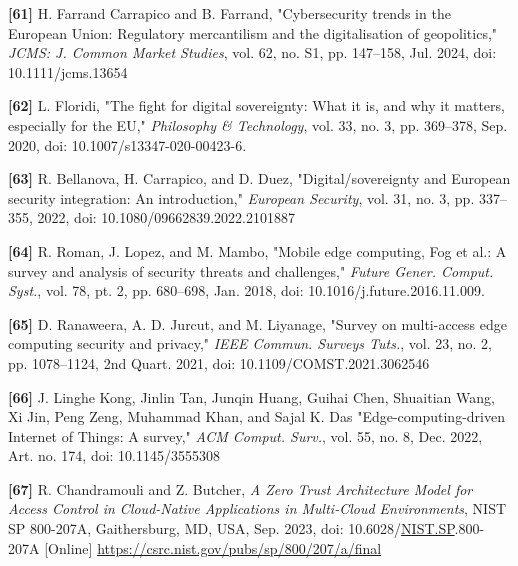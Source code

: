 \documentclass{ieeeaccess}
\begin{document}
\textbf{{[}61{]}} H. Farrand Carrapico and B. Farrand, "Cybersecurity
trends in the European Union: Regulatory mercantilism and the
digitalisation of geopolitics," \emph{JCMS: J. Common Market Studies},
vol. 62, no. S1, pp. 147--158, Jul. 2024, doi: 10.1111/jcms.13654

\textbf{{[}62{]}} L. Floridi, "The fight for digital sovereignty: What
it is, and why it matters, especially for the EU," \emph{Philosophy \&
Technology}, vol. 33, no. 3, pp. 369--378, Sep. 2020, doi:
10.1007/s13347-020-00423-6.

\textbf{{[}63{]}} R. Bellanova, H. Carrapico, and D. Duez,
"Digital/sovereignty and European security integration: An
introduction," \emph{European Security}, vol. 31, no. 3, pp. 337--355,
2022, doi: 10.1080/09662839.2022.2101887

\textbf{{[}64{]}} R. Roman, J. Lopez, and M. Mambo, "Mobile edge
computing, Fog et al.: A survey and analysis of security threats and
challenges," \emph{Future Gener. Comput. Syst.}, vol. 78, pt. 2, pp.
680--698, Jan. 2018, doi: 10.1016/j.future.2016.11.009.

\textbf{{[}65{]}} D. Ranaweera, A. D. Jurcut, and M. Liyanage, "Survey
on multi-access edge computing security and privacy," \emph{IEEE Commun.
Surveys Tuts.}, vol. 23, no. 2, pp. 1078--1124, 2nd Quart. 2021, doi:
10.1109/COMST.2021.3062546

\textbf{{[}66{]}} J. Linghe Kong, Jinlin Tan, Junqin Huang, Guihai Chen,
Shuaitian Wang, Xi Jin, Peng Zeng, Muhammad Khan, and Sajal K. Das
"Edge-computing-driven Internet of Things: A survey," \emph{ACM Comput.
Surv.}, vol. 55, no. 8, Dec. 2022, Art. no. 174, doi: 10.1145/3555308

\textbf{{[}67{]}} R. Chandramouli and Z. Butcher, \emph{A Zero Trust
Architecture Model for Access Control in Cloud-Native Applications in
Multi-Cloud Environments}, NIST SP 800-207A, Gaithersburg, MD, USA, Sep.
2023, doi: 10.6028/\href{http://nist.sp}{NIST.SP}.800-207A
{[}Online{]}
\href{https://csrc.nist.gov/pubs/sp/800/207/a/final}{https://csrc.nist.gov/pubs/sp/800/207/a/final}
\end{document}
